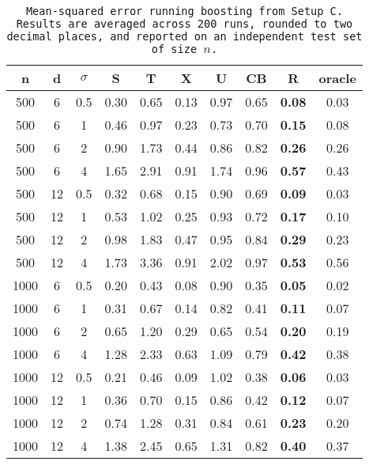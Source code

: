 \begin{table}[ht]
\centering
\begin{tabular}{cccccccccc}
  \hline
n & d & $\sigma$ & S & T & X & U & CB & R & oracle \\ 
  \hline
500 & 6 & 0.5 & 0.30 & 0.65 & 0.13 & 0.97 & 0.65 & \bf 0.08 & 0.03 \\ 
  500 & 6 & 1 & 0.46 & 0.97 & 0.23 & 0.73 & 0.70 & \bf 0.15 & 0.08 \\ 
  500 & 6 & 2 & 0.90 & 1.73 & 0.44 & 0.86 & 0.82 & \bf 0.26 & 0.26 \\ 
  500 & 6 & 4 & 1.65 & 2.91 & 0.91 & 1.74 & 0.96 & \bf 0.57 & 0.43 \\ 
  500 & 12 & 0.5 & 0.32 & 0.68 & 0.15 & 0.90 & 0.69 & \bf 0.09 & 0.03 \\ 
  500 & 12 & 1 & 0.53 & 1.02 & 0.25 & 0.93 & 0.72 & \bf 0.17 & 0.10 \\ 
  500 & 12 & 2 & 0.98 & 1.83 & 0.47 & 0.95 & 0.84 & \bf 0.29 & 0.23 \\ 
  500 & 12 & 4 & 1.73 & 3.36 & 0.91 & 2.02 & 0.97 & \bf 0.53 & 0.56 \\ 
  1000 & 6 & 0.5 & 0.20 & 0.43 & 0.08 & 0.90 & 0.35 & \bf 0.05 & 0.02 \\ 
  1000 & 6 & 1 & 0.31 & 0.67 & 0.14 & 0.82 & 0.41 & \bf 0.11 & 0.07 \\ 
  1000 & 6 & 2 & 0.65 & 1.20 & 0.29 & 0.65 & 0.54 & \bf 0.20 & 0.19 \\ 
  1000 & 6 & 4 & 1.28 & 2.33 & 0.63 & 1.09 & 0.79 & \bf 0.42 & 0.38 \\ 
  1000 & 12 & 0.5 & 0.21 & 0.46 & 0.09 & 1.02 & 0.38 & \bf 0.06 & 0.03 \\ 
  1000 & 12 & 1 & 0.36 & 0.70 & 0.15 & 0.86 & 0.42 & \bf 0.12 & 0.07 \\ 
  1000 & 12 & 2 & 0.74 & 1.28 & 0.31 & 0.84 & 0.61 & \bf 0.23 & 0.20 \\ 
  1000 & 12 & 4 & 1.38 & 2.45 & 0.65 & 1.31 & 0.82 & \bf 0.40 & 0.37 \\ 
   \hline
\end{tabular}
\caption{\tt Mean-squared error running \texttt{boosting} from Setup C. Results are averaged across 200 runs, rounded to two decimal places, and reported on an independent test set of size $n$.} 
\label{table:setup3}
\end{table}
